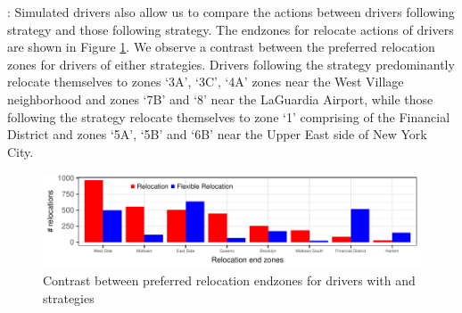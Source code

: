 :
Simulated drivers also allow us to compare the {\relocate} actions between drivers following {\relocation} strategy and those following {\relocationflexible} strategy. The endzones for relocate actions of drivers are shown in Figure \ref{fig:relocation_endzones}. We observe a contrast between the preferred relocation zones for drivers of either strategies. Drivers following the {\relocation} strategy predominantly relocate themselves to zones `3A', `3C', `4A' zones near the West Village neighborhood and zones `7B' and `8' near the LaGuardia Airport, while those following the {\relocationflexible} strategy relocate themselves to zone `1' comprising of the Financial District and zones `5A', `5B' and `6B' near the Upper East side of New York City.

\begin{figure}
	\centering
	\includegraphics{figures/relocation_endzones.pdf}
	\caption{Contrast between preferred relocation endzones for drivers with 
	{\relocation} and {\relocationflexible} strategies}
	\label{fig:relocation_endzones}
\end{figure}

